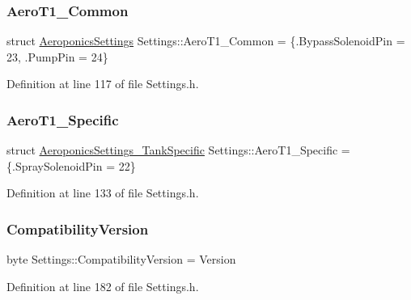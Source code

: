 \mbox{\label{struct_settings_a6ec59b1aee19add68b8724ce686a8a77}} 
\subsubsection{\texorpdfstring{Aero\+T1\+\_\+\+Common}{AeroT1\_Common}}
{\footnotesize\ttfamily struct \hyperlink{struct_settings_1_1_aeroponics_settings}{Aeroponics\+Settings} Settings\+::\+Aero\+T1\+\_\+\+Common = \{.Bypass\+Solenoid\+Pin = 23, .Pump\+Pin = 24\}}



Definition at line 117 of file Settings.\+h.

\mbox{\label{struct_settings_ab6250c7f010ce991a18f7fc4b23bf078}} 
\subsubsection{\texorpdfstring{Aero\+T1\+\_\+\+Specific}{AeroT1\_Specific}}
{\footnotesize\ttfamily struct \hyperlink{struct_settings_1_1_aeroponics_settings___tank_specific}{Aeroponics\+Settings\+\_\+\+Tank\+Specific} Settings\+::\+Aero\+T1\+\_\+\+Specific = \{.Spray\+Solenoid\+Pin = 22\}}



Definition at line 133 of file Settings.\+h.

\mbox{\label{struct_settings_ae5627689dde65d3312155975a4b2fcb4}} 
\subsubsection{\texorpdfstring{Compatibility\+Version}{CompatibilityVersion}}
{\footnotesize\ttfamily byte Settings\+::\+Compatibility\+Version = Version}



Definition at line 182 of file Settings.\+h.

\mbox{\label{struct_settings_ae85fc15d5c9994d5249d43ff3009fbd5}} 
